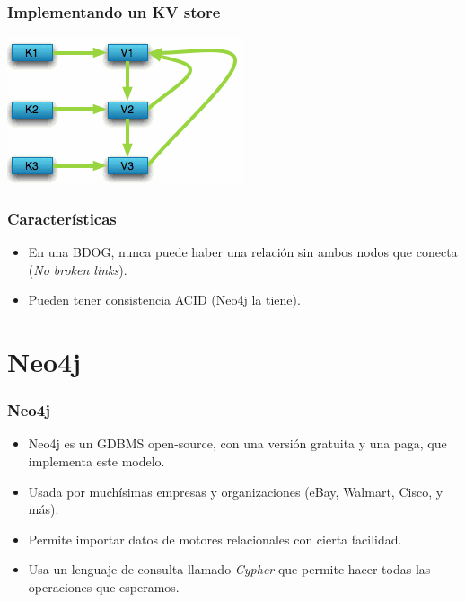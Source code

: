 \begin{frame}
\frametitle{Implementando un KV store}
 \center
 \includegraphics[width=0.9\linewidth,height=0.9\textheight,keepaspectratio]{bdog-4}
\end{frame}

\begin{frame}
\frametitle{Características}
\begin{itemize}
\item	En una BDOG, nunca puede haber una relación sin ambos nodos
	que conecta (\textit{No broken links}).
	\pause

\item	Pueden tener consistencia ACID (Neo4j la tiene).
\end{itemize}
\end{frame}

\section{Neo4j}

\begin{frame}
\frametitle{Neo4j}
\begin{itemize}
\item	Neo4j es un GDBMS open-source, con una versión gratuita y una
	paga, que implementa este modelo.
	\pause

\item	Usada por muchísimas empresas y organizaciones (eBay, Walmart,
	Cisco, y más).
	\pause

\item	Permite importar datos de motores relacionales con cierta
	facilidad.
	\pause

\item	Usa un lenguaje de consulta llamado \textit{Cypher} que permite
	hacer todas las operaciones que esperamos.
\end{itemize}
\end{frame}

